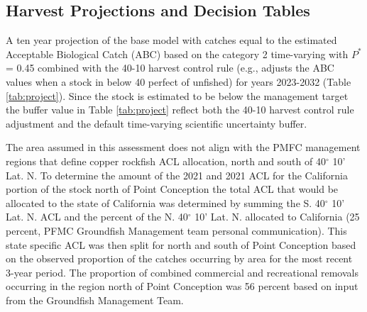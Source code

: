 \documentclass[11pt,
  english,
  a4paper,
]{article}
\begin{document}
\leavevmode\tagmcend\tagstructend\par


\hypertarget{harvest-projections-and-decision-tables}{%
\subsection{Harvest Projections and Decision Tables}\label{harvest-projections-and-decision-tables}}

\leavevmode\tagmcend\tagstructend


A ten year projection of the base model with catches equal to the estimated Acceptable Biological Catch (ABC) based on the category 2 time-varying with {\(P^*\)\leavevmode\tagmcend\tagstructend} = 0.45 combined with the 40-10 harvest control rule (e.g., adjusts the ABC values when a stock in below 40 perfect of unfished) for years 2023-2032 (Table \ref{tab:project}). Since the stock is estimated to be below the management target the buffer value in Table \ref{tab:project} reflect both the 40-10 harvest control rule adjustment and the default time-varying scientific uncertainty buffer.

\leavevmode\tagmcend\tagstructend\par


The area assumed in this assessment does not align with the PMFC management regions that define copper rockfish ACL allocation, north and south of 40{\(^\circ\)\leavevmode\tagmcend\tagstructend} 10' Lat. N. To determine the amount of the 2021 and 2021 ACL for the California portion of the stock north of Point Conception the total ACL that would be allocated to the state of California was determined by summing the S. 40{\(^\circ\)\leavevmode\tagmcend\tagstructend} 10' Lat. N. ACL and the percent of the N. 40{\(^\circ\)\leavevmode\tagmcend\tagstructend} 10' Lat. N. allocated to California (25 percent, PFMC Groundfish Management team personal communication). This state specific ACL was then split for north and south of Point Conception based on the observed proportion of the catches occurring by area for the most recent 3-year period. The proportion of combined commercial and recreational removals occurring in the region north of Point Conception was 56 percent based on input from the Groundfish Management Team.
\end{document}
